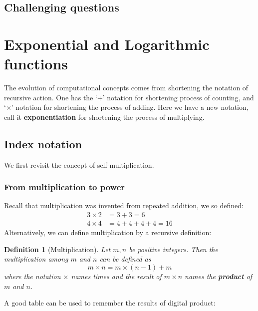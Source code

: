 \documentclass[12pt]{article}
\newtheorem{definition}{Definition}[section]
\begin{document}
    \subsection{Challenging questions}

    \newpage

    \section{Exponential and Logarithmic functions}

    The evolution of computational concepts comes from shortening the notation of recursive action. One has the `+' notation for shortening process of counting, and `$\times$' notation for shortening the process of adding. Here we have a new notation, call it \textbf{exponentiation} for shortening the process of multiplying.

    \subsection{Index notation}

    We first revisit the concept of self-multiplication.

    \subsubsection*{From multiplication to power}

    Recall that multiplication was invented from repeated addition, we so defined: \begin{align*}
        3\times 2&=3+3=6\\
        4\times 4&=4+4+4+4=16
    \end{align*}
    Alternatively, we can define multiplication by a recursive definition:

    \begin{definition}[Multiplication]
        Let $m,n$ be positive integers. Then the multiplication among $m$ and $n$ can be defined as $$m\times n= m\times (n-1) + m$$
        where the notation $\times$ names times and the result of $m\times n$ names the \textbf{product} of $m$ and $n$.
    \end{definition}

    A good table can be used to remember the results of digital product:
\end{document}
